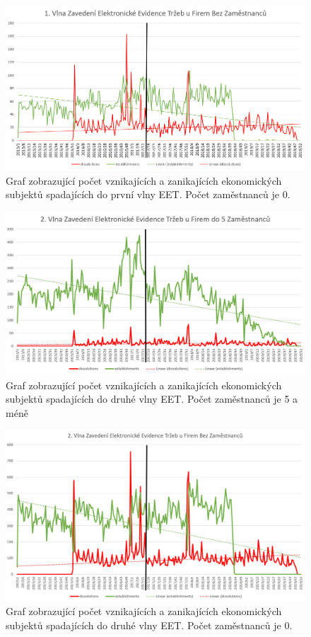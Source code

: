 \documentclass[a4paper, 12pt]{article}
\begin{document}
\begin{figure}[ht]
	\centering
	\includegraphics[width=12cm]{1st_bez.png}
	\caption{Graf zobrazující počet vznikajících a zanikajících ekonomických subjektů spadajících do první vlny EET. Počet zaměstnanců je 0.}
\end{figure}

\begin{figure}[ht]
	\centering
	\includegraphics[width=12cm]{2nd_do5.png}
	\caption{Graf zobrazující počet vznikajících a zanikajících ekonomických subjektů spadajících do druhé vlny EET. Počet zaměstnanců je 5 a méně}
\end{figure}

\begin{figure}[ht]
	\centering
	\includegraphics[width=12cm]{2nd_bez.png}
	\caption{Graf zobrazující počet vznikajících a zanikajících ekonomických subjektů spadajících do druhé vlny EET. Počet zaměstnanců je 0.}
\end{figure}
\end{document}
